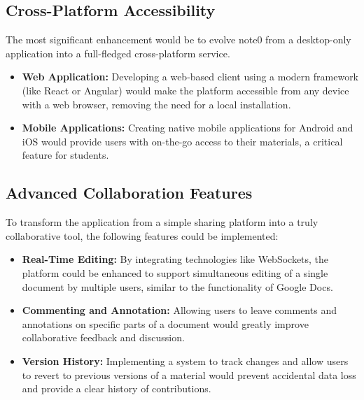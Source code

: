 \documentclass[12pt, a4paper]{report}
\begin{document}
\subsection{Cross-Platform Accessibility}
The most significant enhancement would be to evolve note0 from a desktop-only application into a full-fledged cross-platform service.
\begin{itemize}
    \item \textbf{Web Application:} Developing a web-based client using a modern framework (like React or Angular) would make the platform accessible from any device with a web browser, removing the need for a local installation.
    \item \textbf{Mobile Applications:} Creating native mobile applications for Android and iOS would provide users with on-the-go access to their materials, a critical feature for students.
\end{itemize}

\subsection{Advanced Collaboration Features}
To transform the application from a simple sharing platform into a truly collaborative tool, the following features could be implemented:
\begin{itemize}
    \item \textbf{Real-Time Editing:} By integrating technologies like WebSockets, the platform could be enhanced to support simultaneous editing of a single document by multiple users, similar to the functionality of Google Docs.
    \item \textbf{Commenting and Annotation:} Allowing users to leave comments and annotations on specific parts of a document would greatly improve collaborative feedback and discussion.
    \item \textbf{Version History:} Implementing a system to track changes and allow users to revert to previous versions of a material would prevent accidental data loss and provide a clear history of contributions.
\end{itemize}
\end{document}
